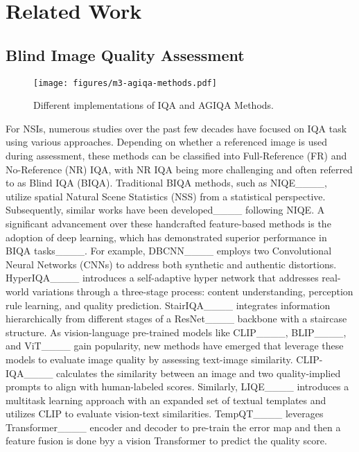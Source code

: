\section{Related Work}
\label{sec:related}
\subsection{Blind Image Quality Assessment}
\begin{figure}
    \centering
    \texttt{[image: figures/m3-agiqa-methods.pdf]}
    \caption{Different implementations of IQA and AGIQA Methods.}
    \label{fig:related_work}
\end{figure}
For NSIs, numerous studies over the past few decades have focused on IQA task using various approaches. 
Depending on whether a referenced image is used during assessment, these methods can be classified into Full-Reference (FR) and No-Reference (NR) IQA, with NR IQA being more challenging and often referred to as Blind IQA (BIQA).
Traditional BIQA methods, such as NIQE____, utilize spatial Natural Scene Statistics (NSS) from a statistical perspective. 
Subsequently, similar works have been developed____ following NIQE.
A significant advancement over these handcrafted feature-based methods is the adoption of deep learning, which has demonstrated superior performance in BIQA tasks____.
For example, DBCNN____ employs two Convolutional Neural Networks (CNNs) to address both synthetic and authentic distortions. 
HyperIQA____ introduces a self-adaptive hyper network that addresses real-world variations through a three-stage process: content understanding, perception rule learning, and quality prediction.
StairIQA____ integrates information hierarchically from different stages of a ResNet____ backbone with a staircase structure.
As vision-language pre-trained models like CLIP____, BLIP____, and ViT____ gain popularity, new methods have emerged that leverage these models to evaluate image quality by assessing text-image similarity.
CLIP-IQA____ calculates the similarity between an image and two quality-implied prompts to align with human-labeled scores.
Similarly, LIQE____ introduces a multitask learning approach with an expanded set of textual templates and utilizes CLIP to evaluate vision-text similarities. TempQT____ leverages Transformer____ encoder and decoder to pre-train the error map and then a feature fusion is done byy a vision Transformer to predict the quality score.

